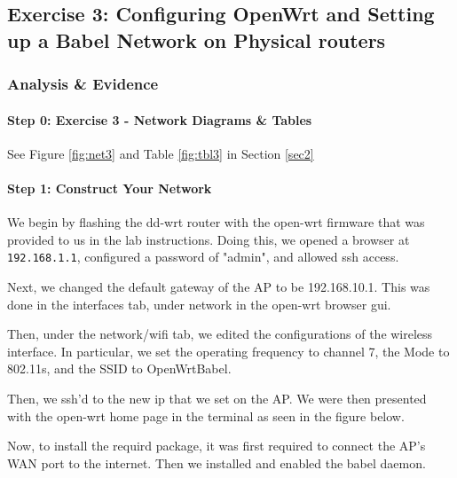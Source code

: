 \documentclass[main.tex]{subfiles}
\begin{document}
\subsection{Exercise 3: Configuring OpenWrt and Setting up a Babel Network on Physical routers}
\subsubsection{Analysis \& Evidence }
\paragraph{Step 0: Exercise 3 - Network Diagrams \& Tables}
\hfill \break
See Figure \ref{fig:net3} and Table \ref{fig:tbl3} in Section \ref{sec2}

\paragraph{Step 1: Construct Your Network}
\hfill \break

\noindent We begin by flashing the dd-wrt router with the open-wrt firmware that was provided to us in the lab instructions. Doing this, we opened a browser at \texttt{192.168.1.1}, configured a password  of "admin", and allowed ssh access.


Next, we changed the default gateway of the AP to be 192.168.10.1. This was done in the interfaces tab, under network in the open-wrt browser gui.  


Then, under the network/wifi tab, we edited the configurations of the wireless interface. In particular, we set the operating frequency to channel 7, the Mode to 802.11s, and the SSID to OpenWrtBabel.



Then, we ssh'd to the new ip that we set on the AP. We were then presented with the open-wrt home page in the terminal as seen in the figure below.


Now, to install the requird package, it was first required to connect the AP's WAN port to the internet. Then we installed and enabled the babel daemon. 
\end{document}
